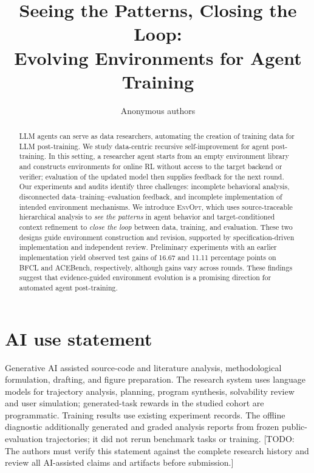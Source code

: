 \documentclass{article}
\title{Seeing the Patterns, Closing the Loop:\\Evolving Environments for Agent Training}
\author{Anonymous authors}
\newcommand{\method}{\textsc{EnvOpt}}
\newcommand{\todo}[1]{\textcolor{red!65!black}{[TODO: #1]}}
\begin{document}
\maketitle
\begin{abstract}
LLM agents can serve as data researchers, automating the creation of training data for LLM post-training. We study data-centric recursive self-improvement for agent post-training. In this setting, a researcher agent starts from an empty environment library and constructs environments for online RL without access to the target backend or verifier; evaluation of the updated model then supplies feedback for the next round. Our experiments and audits identify three challenges: incomplete behavioral analysis, disconnected data--training--evaluation feedback, and incomplete implementation of intended environment mechanisms. We introduce \method{}, which uses source-traceable hierarchical analysis to \emph{see the patterns} in agent behavior and target-conditioned context refinement to \emph{close the loop} between data, training, and evaluation. These two designs guide environment construction and revision, supported by specification-driven implementation and independent review. Preliminary experiments with an earlier implementation yield observed test gains of 16.67 and 11.11 percentage points on BFCL and ACEBench, respectively, although gains vary across rounds. These findings suggest that evidence-guided environment evolution is a promising direction for automated agent post-training.
\end{abstract}








\section*{AI use statement}
Generative AI assisted source-code and literature analysis, methodological formulation, drafting, and figure preparation. The research system uses language models for trajectory analysis, planning, program synthesis, solvability review and user simulation; generated-task rewards in the studied cohort are programmatic. Training results use existing experiment records. The offline diagnostic additionally generated and graded analysis reports from frozen public-evaluation trajectories; it did not rerun benchmark tasks or training. \todo{The authors must verify this statement against the complete research history and review all AI-assisted claims and artifacts before submission.}
\end{document}
